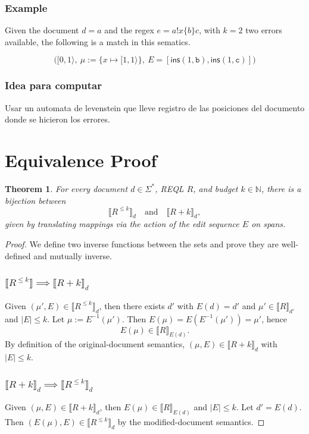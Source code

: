 \documentclass{article}
\newtheorem{theorem}{Theorem}
\begin{document}
\subsubsection{Example}


Given the document $d = a$ and the regex $e = a!x\{b\}c$, with $k = 2$ two errors available, the following is a match in this sematics.

\[
\Big([0,1\rangle,\ \mu := \{x \mapsto [1,1\rangle\},\ E = [\mathsf{ins}(1,\texttt{b}), \mathsf{ins}(1,\texttt{c})]\Big)
\]

\subsubsection{Idea para computar}

Usar un automata de levenstein que lleve registro de las posiciones del documento donde se hicieron los errores.


\section{Equivalence Proof}

\begin{theorem}
	For every document $d\in\Sigma^*$, REQL $R$, and budget $k\in\mathbb{N}$, there is a bijection between
	\[
	\llbracket R^{\le k}\rrbracket_d
	\quad\text{and}\quad
	\llbracket R + k\rrbracket_d,
	\]
	given by translating mappings via the action of the edit sequence $E$ on spans.
\end{theorem}

\begin{proof}
	We define two inverse functions between the sets and prove they are well-defined and mutually inverse.
	
\subsubsection{$\llbracket R^{\leq k} \rrbracket \implies \llbracket R + k \rrbracket_d$}
	Given $(\mu',E)\in \llbracket R^{\le k}\rrbracket_d$, then there exists $d'$ with $E(d)=d'$ and $\mu'\in\llbracket R\rrbracket_{d'}$ and $|E|\le k$.
	Let $\mu := E^{-1}(\mu')$. Then $E(\mu)=E(E^{-1}(\mu'))=\mu'$, hence
	\[
	E(\mu)\in \llbracket R\rrbracket_{E(d)}.
	\]
	By definition of the original-document semantics, $(\mu,E)\in \llbracket R + k\rrbracket_d$ with $|E|\le k$.
	

\subsubsection{$\llbracket R + k \rrbracket_d \implies \llbracket R ^{\leq k} \rrbracket_d$}	
	Given $(\mu,E)\in \llbracket R + k\rrbracket_d$, then $E(\mu)\in\llbracket R\rrbracket_{E(d)}$ and $|E|\le k$.
	Let $d' = E(d)$. Then $(E(\mu),E)\in \llbracket R^{\le k}\rrbracket_d$ by the modified-document semantics.
	
	
\end{proof}
\end{document}
